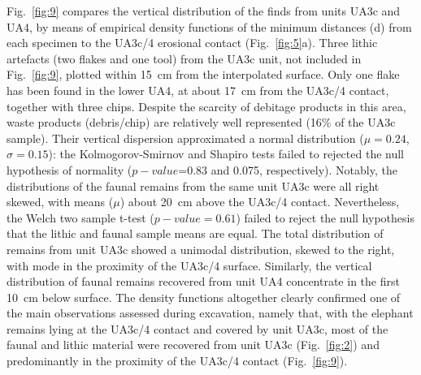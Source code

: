 \documentclass[preprint,authoryear,times]{elsarticle} %
\begin{document}
Fig.~\ref{fig:9} compares the vertical distribution of the finds from units UA3c and UA4, by means of empirical density functions of the minimum distances (d) from each specimen to the UA3c/4 erosional contact (Fig.~\ref{fig:5}a). Three lithic artefacts (two flakes and one tool) from the UA3c unit, not included in Fig.~\ref{fig:9}, plotted within 15~cm from the interpolated surface. Only one flake has been found in the lower UA4, at about 17~cm from the UA3c/4 contact, together with three chips. Despite the scarcity of debitage products in this area, waste products (debris/chip) are relatively well represented (16\% of the UA3c sample). Their vertical dispersion approximated a normal distribution ($\mu=0.24$, $\sigma=0.15$): the Kolmogorov-Smirnov and Shapiro tests failed to rejected the null hypothesis of normality ($p-value$=0.83 and 0.075, respectively). Notably, the distributions of the faunal remains from the same unit UA3c were all right skewed, with means ($\mu$) about 20~cm above the UA3c/4 contact. Nevertheless, the Welch two sample t-test ($p-value=0.61$) failed to reject the null hypothesis that the lithic and faunal sample means are equal. The total distribution of remains from unit UA3c showed a unimodal distribution, skewed to the right, with mode in the proximity of the UA3c/4 surface. Similarly, the vertical distribution of faunal remains recovered from unit UA4 concentrate in the first 10~cm below surface. The density functions altogether clearly confirmed one of the main observations assessed during excavation, namely that, with the elephant remains lying at the UA3c/4 contact and covered by unit UA3c, most of the faunal and lithic material were recovered from unit UA3c (Fig.~\ref{fig:2}) and predominantly in the proximity of the UA3c/4 contact (Fig.~\ref{fig:9}).
\end{document}
